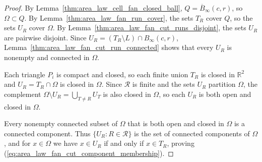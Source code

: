 \begin{proof}
    \leanok
    By Lemma~\ref{thm:area_law_cell_fan_closed_ball},
    $Q=\overline B_\infty(c,r)$, so $\Omega\subset Q$.
    By Lemma~\ref{thm:area_law_fan_run_cover}, the sets $T_R$ cover
    $Q$, so the sets $U_R$ cover $\Omega$.
    By Lemma~\ref{thm:area_law_fan_cut_runs_disjoint}, the sets $U_R$ are
    pairwise disjoint. Since $U_R=(T_R\setminus L)\cap B_\infty(c,r)$,
    Lemma~\ref{thm:area_law_fan_cut_run_connected} shows that every
    $U_R$ is nonempty and connected in $\Omega$.

    Each triangle $P_i$ is compact and closed, so each finite union $T_R$ is
    closed in $\mathbb R^2$ and $U_R=T_R\cap\Omega$ is closed in $\Omega$.
    Since $\mathcal R$ is finite and the sets $U_R$ partition $\Omega$, the
    complement $\Omega\setminus U_R=\bigcup_{T\ne R}U_T$ is also closed in
    $\Omega$, so each $U_R$ is both open and closed in $\Omega$.

    Every nonempty connected subset of $\Omega$ that is both open and closed in
    $\Omega$ is a connected component. Thus $\{U_R:R\in\mathcal R\}$ is the set
    of connected components of $\Omega$, and for $x\in\Omega$ we have
    $x\in U_R$ if and only if $x\in T_R$, proving
    (\ref{eq:area_law_fan_cut_component_membership}).
\end{proof}
